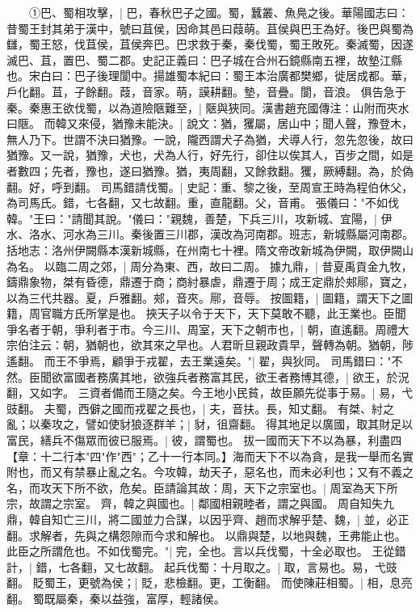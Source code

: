 　　①巴、蜀相攻擊，|{
	巴，春秋巴子之國。蜀，蠶叢、魚鳧之後。華陽國志曰：昔蜀王封其弟于漢中，號曰苴侯，因命其邑曰葭萌。苴侯與巴王為好。後巴與蜀為讎，蜀王怒，伐苴侯，苴侯奔巴。巴求救于秦，秦伐蜀，蜀王敗死。秦滅蜀，因遂滅巴、苴，置巴、蜀二郡。史記正義曰：巴子城在合州石鏡縣南五裡，故墊江縣也。宋白曰：巴子後理閬中。揚雄蜀本紀曰：蜀王本治廣都樊鄉，徙居成都。華，戶化翻。苴，子餘翻。葭，音家。萌，謨耕翻。墊，音疊。閬，音浪。
	}
俱告急于秦。秦惠王欲伐蜀，以為道險陿難至，|{
	陿與狹同。漢書趙充國傳注：山附而夾水曰陿。
	}
而韓又來侵，猶豫未能決。|{
	說文：猶，玃屬，居山中；聞人聲，豫登木，無人乃下。世謂不決曰猶豫。一說，隴西謂犬子為猶，犬導人行，忽先忽後，故曰猶豫。又一說，猶豫，犬也，犬為人行，好先行，卻住以俟其人，百步之間，如是者數四；先者，豫也，遂曰猶豫。猶，夷周翻，又餘救翻。玃，厥縛翻。為，於偽翻。好，呼到翻。
	}
司馬錯請伐蜀。|{
	史記：重、黎之後，至周宣王時為程伯休父，為司馬氏。錯，七各翻，又七故翻。重，直龍翻。父，音甫。
	}
張儀曰："不如伐韓。"王曰："請聞其說。"儀曰："親魏，善楚，下兵三川，攻新城、宜陽，|{
	伊水、洛水、河水為三川。秦後置三川郡，漢改為河南郡。班志，新城縣屬河南郡。括地志：洛州伊闕縣本漢新城縣，在州南七十裡。隋文帝改新城為伊闕，取伊闕山為名。
	}
以臨二周之郊，|{
	周分為東、西，故曰二周。
	}
據九鼎，|{
	昔夏禹貢金九牧，鑄鼎象物，桀有昏德，鼎遷于商；商紂暴虐，鼎遷于周；成王定鼎於郟鄏，寶之，以為三代共器。夏，戶雅翻。郟，音夾。鄏，音辱。
	}
按圖籍，|{
	圖籍，謂天下之圖籍，周官職方氏所掌是也。
	}
挾天子以令于天下，天下莫敢不聽，此王業也。臣聞爭名者于朝，爭利者于市。今三川、周室，天下之朝市也，|{
	朝，直遙翻。周禮大宗伯注云：朝，猶朝也，欲其來之早也。人君昕旦親政貴早，聲轉為朝。猶朝，陟遙翻。
	}
而王不爭焉，顧爭于戎翟，去王業遠矣。"|{
	翟，與狄同。
	}
司馬錯曰："不然。臣聞欲富國者務廣其地，欲強兵者務富其民，欲王者務博其德，|{
	欲王，於況翻，又如字。
	}
三資者備而王隨之矣。今王地小民貧，故臣願先從事于易。|{
	易，弋豉翻。
	}
夫蜀，西僻之國而戎翟之長也，|{
	夫，音扶。長，知丈翻。
	}
有桀、紂之亂；以秦攻之，譬如使豺狼逐群羊；|{
	豺，徂齋翻。
	}
得其地足以廣國，取其財足以富民，繕兵不傷眾而彼已服焉。|{
	彼，謂蜀也。
	}
拔一國而天下不以為暴，利盡四【章：十二行本"四"作"西"；乙十一行本同。】海而天下不以為貪，是我一舉而名實附也，而又有禁暴止亂之名。今攻韓，劫天子，惡名也，而未必利也；又有不義之名，而攻天下所不欲，危矣。臣請論其故：周，天下之宗室也。|{
	周室為天下所宗，故謂之宗室。
	}
齊，韓之與國也。|{
	鄰國相親睦者，謂之與國。
	}
周自知失九鼎，韓自知亡三川，將二國並力合謀，以因乎齊、趙而求解乎楚、魏，|{
	並，必正翻。求解者，先與之構怨隙而今求和解也。
	}
以鼎與楚，以地與魏，王弗能止也。此臣之所謂危也。不如伐蜀完。"|{
	完，全也。言以兵伐蜀，十全必取也。
	}
王從錯計，|{
	錯，七各翻，又七故翻。
	}
起兵伐蜀：十月取之。|{
	取，言易也。易，弋豉翻。
	}
貶蜀王，更號為侯；|{
	貶，悲檢翻。更，工衡翻。
	}
而使陳莊相蜀。|{
	相，息亮翻。
	}
蜀既屬秦，秦以益強，富厚，輕諸侯。


